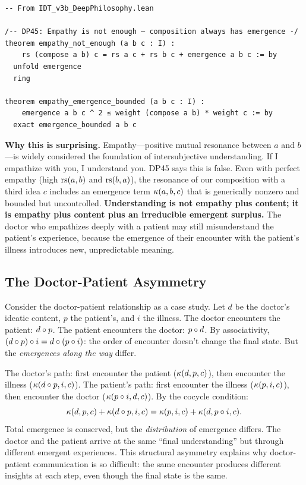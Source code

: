 \begin{lstlisting}
-- From IDT_v3b_DeepPhilosophy.lean

/-- DP45: Empathy is not enough — composition always has emergence -/
theorem empathy_not_enough (a b c : I) :
    rs (compose a b) c = rs a c + rs b c + emergence a b c := by
  unfold emergence
  ring

theorem empathy_emergence_bounded (a b c : I) :
    emergence a b c ^ 2 ≤ weight (compose a b) * weight c := by
  exact emergence_bounded a b c
\end{lstlisting}

\begin{surprisebox}
\noindent\textbf{Why this is surprising.}
Empathy---positive mutual resonance between $a$ and $b$---is widely considered
the foundation of intersubjective understanding.  If I empathize with you, I
understand you.  DP45 says this is false.  Even with perfect empathy (high
$\mathrm{rs}(a, b)$ and $\mathrm{rs}(b, a)$), the resonance of our composition with a third
idea $c$ includes an emergence term $\kappa(a, b, c)$ that is generically
nonzero and bounded but uncontrolled.  \textbf{Understanding is not
empathy plus content; it is empathy plus content plus an irreducible emergent
surplus.}  The doctor who empathizes deeply with a patient may still
misunderstand the patient's experience, because the emergence of their
encounter with the patient's illness introduces new, unpredictable meaning.
\end{surprisebox}

\subsection{The Doctor-Patient Asymmetry}

Consider the doctor-patient relationship as a case study.  Let $d$ be the
doctor's ideatic content, $p$ the patient's, and $i$ the illness.  The doctor
encounters the patient: $d \circ p$.  The patient encounters the doctor:
$p \circ d$.  By associativity, $(d \circ p) \circ i =
d \circ (p \circ i)$: the order of encounter doesn't change the final
state.  But the \emph{emergences along the way} differ.

The doctor's path: first encounter the patient ($\kappa(d, p, c)$), then
encounter the illness ($\kappa(d \circ p, i, c)$).  The patient's
path: first encounter the illness ($\kappa(p, i, c)$), then encounter
the doctor ($\kappa(p \circ i, d, c)$).  By the cocycle condition:
\[
\kappa(d, p, c) + \kappa(d \circ p, i, c)
= \kappa(p, i, c) + \kappa(d, p \circ i, c).
\]
Total emergence is conserved, but the \emph{distribution} of emergence
differs.  The doctor and the patient arrive at the same ``final understanding''
but through different emergent experiences.  This structural asymmetry explains
why doctor-patient communication is so difficult: the same encounter produces
different insights at each step, even though the final state is the same.

